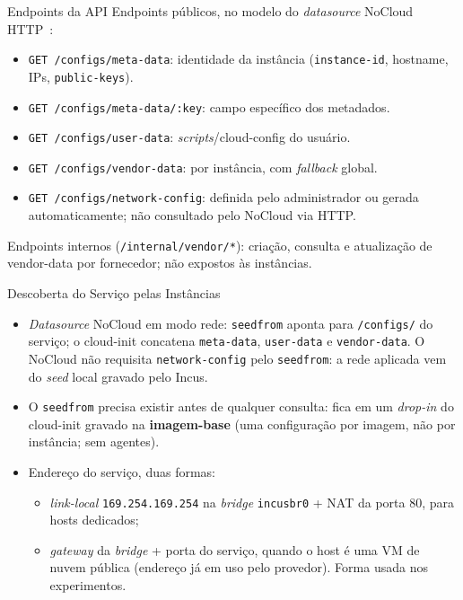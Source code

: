 \documentclass[aspectratio=169,xcolor=table]{beamer}
\begin{document}
\begin{frame}{Endpoints da API}
    Endpoints públicos, no modelo do \textit{datasource} NoCloud
    HTTP~\cite{cloudinit_nocloud}:
    \begin{itemize}
        \item \texttt{GET /configs/meta-data}: identidade da instância
              (\texttt{instance-id}, hostname, IPs, \texttt{public-keys}).
        \item \texttt{GET /configs/meta-data/:key}: campo específico dos metadados.
        \item \texttt{GET /configs/user-data}: \textit{scripts}/cloud-config do usuário.
        \item \texttt{GET /configs/vendor-data}: por instância, com \textit{fallback}
              global.
        \item \texttt{GET /configs/network-config}: definida pelo administrador ou
              gerada automaticamente; não consultado pelo NoCloud via HTTP.
    \end{itemize}
    \vspace{0.3cm}
    Endpoints internos (\texttt{/internal/vendor/*}): criação, consulta e atualização
    de vendor-data por fornecedor; não expostos às instâncias.
\end{frame}

\begin{frame}{Descoberta do Serviço pelas Instâncias}
    \begin{itemize}
        \item \textit{Datasource} NoCloud em modo rede: \texttt{seedfrom} aponta para
              \texttt{/configs/} do serviço; o cloud-init concatena
              \texttt{meta-data}, \texttt{user-data} e \texttt{vendor-data}.
              O NoCloud não requisita \texttt{network-config} pelo \texttt{seedfrom}:
              a rede aplicada vem do \textit{seed} local gravado pelo Incus.
        \item O \texttt{seedfrom} precisa existir antes de qualquer consulta: fica em
              um \textit{drop-in} do cloud-init gravado na \textbf{imagem-base}
              (uma configuração por imagem, não por instância; sem agentes).
        \item Endereço do serviço, duas formas:
        \begin{itemize}
            \item \textit{link-local} \texttt{169.254.169.254} na \textit{bridge}
                  \texttt{incusbr0} + NAT da porta 80, para hosts dedicados;
            \item \textit{gateway} da \textit{bridge} + porta do serviço, quando o
                  host é uma VM de nuvem pública (endereço já em uso pelo provedor).
                  Forma usada nos experimentos.
        \end{itemize}
    \end{itemize}
\end{frame}
\end{document}
